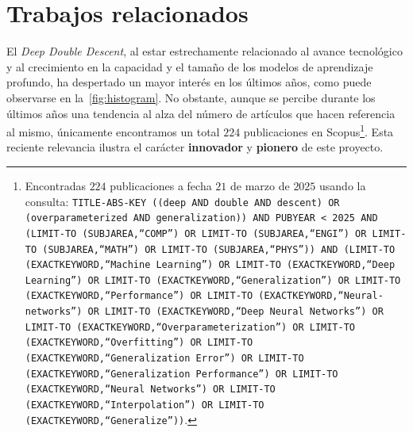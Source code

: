 
\chapter{Trabajos relacionados}\label{sec:evolucion-ddd}

El \emph{Deep Double Descent}, al estar estrechamente relacionado al avance tecnológico y al crecimiento en la capacidad y el tamaño de los modelos de aprendizaje profundo, ha despertado un mayor interés en los últimos años, como puede observarse en la~\autoref{fig:histogram}. No obstante, aunque se percibe durante los últimos años una tendencia al alza del número de artículos que hacen referencia al mismo, únicamente encontramos un total $224$ publicaciones en Scopus\footnote{Encontradas $224$ publicaciones a fecha $21$ de marzo de $2025$ usando la consulta:  
\texttt{TITLE-ABS-KEY ((deep AND double AND descent) OR (overparameterized AND generalization)) AND PUBYEAR < 2025 AND (LIMIT-TO (SUBJAREA,\textquotedblleft COMP\textquotedblright) OR LIMIT-TO (SUBJAREA,\textquotedblleft ENGI\textquotedblright) OR LIMIT-TO (SUBJAREA,\textquotedblleft MATH\textquotedblright) OR LIMIT-TO (SUBJAREA,\textquotedblleft PHYS\textquotedblright)) AND (LIMIT-TO (EXACTKEYWORD,\textquotedblleft Machine Learning\textquotedblright) OR LIMIT-TO (EXACTKEYWORD,\textquotedblleft Deep Learning\textquotedblright) OR LIMIT-TO (EXACTKEYWORD,\textquotedblleft Generalization\textquotedblright) OR LIMIT-TO (EXACTKEYWORD,\textquotedblleft Performance\textquotedblright) OR LIMIT-TO (EXACTKEYWORD,\textquotedblleft Neural-networks\textquotedblright) OR LIMIT-TO (EXACTKEYWORD,\textquotedblleft Deep Neural Networks\textquotedblright) OR LIMIT-TO (EXACTKEYWORD,\textquotedblleft Overparameterization\textquotedblright) OR LIMIT-TO (EXACTKEYWORD,\textquotedblleft Overfitting\textquotedblright) OR LIMIT-TO (EXACTKEYWORD,\textquotedblleft Generalization Error\textquotedblright) OR LIMIT-TO (EXACTKEYWORD,\textquotedblleft Generalization Performance\textquotedblright) OR LIMIT-TO (EXACTKEYWORD,\textquotedblleft Neural Networks\textquotedblright) OR LIMIT-TO (EXACTKEYWORD,\textquotedblleft Interpolation\textquotedblright) OR LIMIT-TO (EXACTKEYWORD,\textquotedblleft Generalize\textquotedblright))}.}. Esta reciente relevancia ilustra el carácter \textbf{innovador} y \textbf{pionero} de este proyecto.\newline

